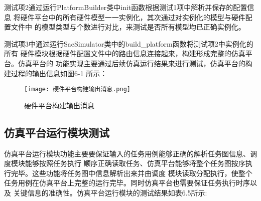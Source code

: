 测试项2通过运行PlatformBuilder类中init函数根据测试1项中解析并保存的配置信息
将硬件平台中的所有硬件模型一一实例化，其次通过对实例化的模型与硬件配置文件中
的模型类型与个数进行对比，来测试是否所有模型均已正确实例化。

测试项3中通过运行SaeSimulator类中的build\_platform函数将测试项2中实例化的所有
硬件模块根据硬件配置文件中的路由信息连接起来，构建形成完整的仿真平台。仿真平台的
功能实现主要通过后续仿真运行结果来进行测试，仿真平台的构建过程的输出信息如图6-1
所示：

\begin{figure}
    \centering
    \texttt{[image: 硬件平台构建输出消息.png]}
    \caption{硬件平台构建输出消息}
    \label{fig:badge}
\end{figure}

\subsection{仿真平台运行模块测试}

仿真平台运行模块功能主要要保证输入的任务用例能够正确的解析任务图信息、调度模块能够按照任务执行
顺序正确读取任务、仿真平台能够将整个任务图按序执行完毕。这些功能将任务图中信息解析出来并由调度
模块读取分配执行，使整个任务用例在仿真平台上完整的运行完毕。同时仿真平台也需要保证任务执行时序以及
关键信息的准确性。仿真平台运行模块的测试结果如表6.5所示:

